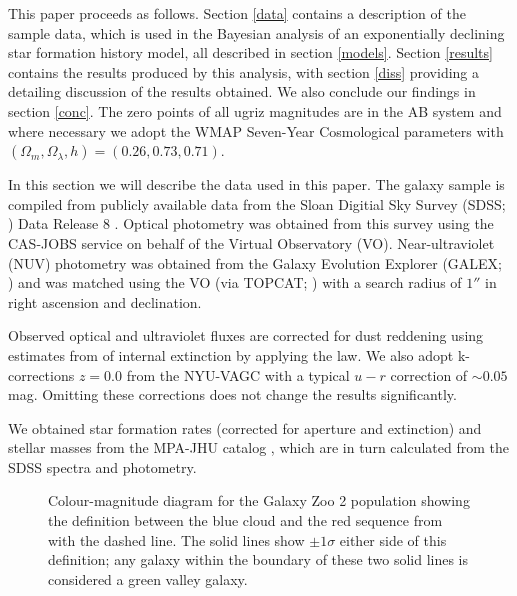 \documentclass{mn2e}
\begin{document}
This paper proceeds as follows. Section \ref{data} contains a description of the sample data, which is used in the Bayesian analysis of an exponentially declining star formation history model, all described in section \ref{models}. Section \ref{results} contains the results produced by this analysis, with section \ref{diss} providing a detailing discussion of the results obtained. We also conclude our findings in section \ref{conc}. The zero points of all ugriz magnitudes are in the AB system and where necessary we adopt the WMAP Seven-Year Cosmological parameters \citep{WMAP} with $(\Omega_m, \Omega_{\lambda}, h) = (0.26, 0.73, 0.71)$. 


In this section we will describe the data used in this paper. The galaxy sample is compiled from publicly available data from the Sloan Digitial Sky Survey (SDSS; \citealt{York00}) Data Release 8 \citep{Aihara11}. Optical photometry was obtained from this survey using the CAS-JOBS service on behalf of the Virtual Observatory (VO). Near-ultraviolet (NUV) photometry was obtained from the Galaxy Evolution Explorer (GALEX; \citealt{Martin05}) and was matched using the VO (via TOPCAT; \citealt{Taylor05}) with a search radius of $1''$ in right ascension and declination. 

Observed optical and ultraviolet fluxes are corrected for dust reddening using estimates from \citet{Oh11} of internal extinction by applying the \citet{Cardelli89} law. We also adopt k-corrections $z=0.0$ from the NYU-VAGC \citep{Blanton05, Pad08, BR07} with a typical $u-r$ correction of $\sim 0.05$ mag. Omitting these corrections does not change the results significantly. 

We obtained star formation rates (corrected for aperture and extinction) and stellar masses from the MPA-JHU catalog \citep{Kauff03, Brinch04}, which are in turn calculated from the SDSS spectra and photometry. 

\begin{figure}
\caption{Colour-magnitude diagram for the Galaxy Zoo 2 population showing the definition between the blue cloud and the red sequence from \citet{Baldry04} with the dashed line. The solid lines show $\pm 1\sigma$ either side of this definition; any galaxy within the boundary of these two solid lines is considered a green valley galaxy.}
\label{CMGV}
\end{figure}
\end{document}
